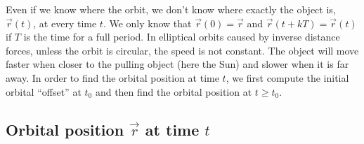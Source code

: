 \begin{appendices}
Even if we know where the orbit, we don't know where exactly the object is, $\vec{r}(t)$, at every time $t$. We only know that $\vec{r}(0) = \vec{r}$ and $\vec{r}(t+kT) = \vec{r}(t)$ if $T$ is the time for a full period. In elliptical orbits caused by inverse distance forces, unless the orbit is circular, the speed is not constant. The object will move faster when closer to the pulling object (here the Sun) and slower when it is far away. In order to find the orbital position at time $t$, we first compute the initial orbital ``offset'' at $t_0$ and then find the orbital position at $t \geq t_0$.

\subsection{Orbital position $\vec{r}$ at time $t$}


\end{appendices}
